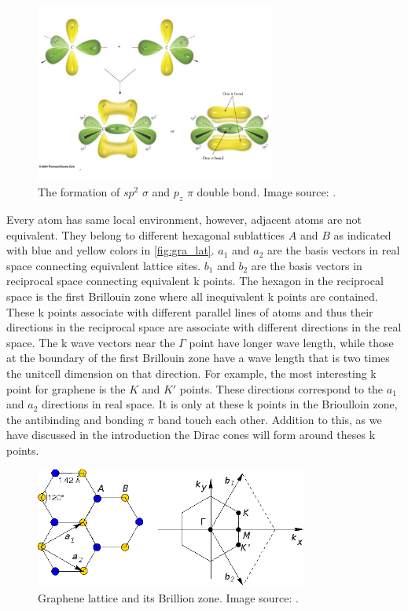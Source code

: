 \begin{figure}[htbp!] 
\centering  
\includegraphics[width=0.7\textwidth]{double_bond}
\caption{The formation of $sp^2$ $\sigma$ and $p_z$ $\pi$ double bond. Image source: \cite{gra_bond}. }  
\label{fig:gra_bond}
\end{figure} 

Every atom has same local environment, however, adjacent atoms are not equivalent. They belong to different hexagonal sublattices $A$ and $B$ as indicated with blue and yellow colors in \autoref{fig:gra_lat}. $a_1$ and $a_2$ are the basis vectors in real space connecting equivalent lattice sites. $b_1$ and $b_2$ are the basis vectors in reciprocal space connecting equivalent k points. The hexagon in the reciprocal space is the first Brillouin zone where all inequivalent k points are contained. These k points associate with different parallel lines of atoms and thus their directions in the reciprocal space are associate with different directions in the real space. The k wave vectors near the $\Gamma$ point have longer wave length, while those at the boundary of the first Brillouin zone have a wave length that is two times the unitcell dimension on that direction. For example, the most interesting k point for graphene is the $K$ and $K'$ points. These directions correspond to the $a_1$ and $a_2$ directions in real space. It is only at these k points in the Brioulloin zone, the antibinding and bonding $\pi$ band touch each other. Addition to this, as we have discussed in the introduction the Dirac cones will form around theses k points. 

\begin{figure}[htbp!] 
\centering  
\includegraphics[width=0.8\textwidth]{gra_lat.eps}
\caption{Graphene lattice and its Brillion zone. Image source: \cite{CastroNeto2009}. }  
\label{fig:gra_lat}
\end{figure} 

